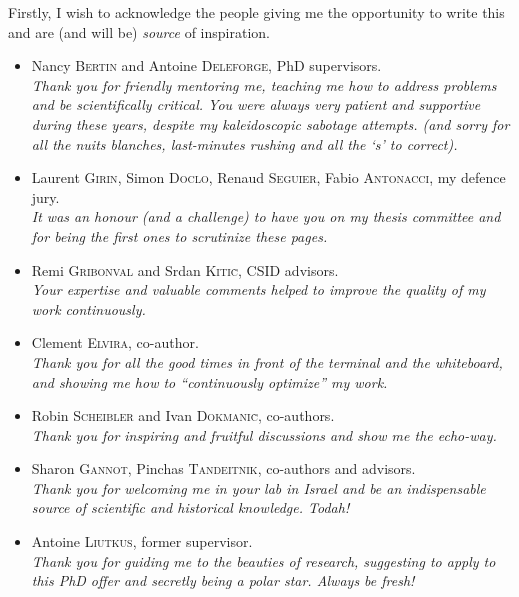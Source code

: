 \mynewline
Firstly, I wish to acknowledge the people giving me the opportunity to write this and are (and will be) \textit{source} of inspiration.
\begin{itemize}
    \item Nancy \textsc{Bertin} and Antoine \textsc{Deleforge}, PhD supervisors.
    \\\textit{Thank you for friendly mentoring me, teaching me how to address problems and be scientifically critical.
    You were always very patient and supportive during these years, despite my kaleidoscopic sabotage attempts.
    (and sorry for all the \emph{nuits blanches}, last-minutes rushing and all the `s' to correct).}

    \item Laurent \textsc{Girin}, Simon \textsc{Doclo}, Renaud \textsc{Seguier}, Fabio \textsc{Antonacci}, my defence jury.
    \\\textit{It was an honour (and a challenge) to have you on my thesis committee and for being the first ones to scrutinize these pages.}

    \item Remi \textsc{Gribonval} and Srdan \textsc{Kiti\`c}, CSID advisors.
    \\\textit{Your expertise and valuable comments helped to improve the quality of my work continuously.}

    \item Clement \textsc{Elvira}, co-author.
    \\\textit{Thank you for all the good times in front of the terminal and the whiteboard, and showing me how to ``continuously optimize'' my work.}

    \item Robin \textsc{Scheibler} and Ivan \textsc{Dokmani\`c}, co-authors.
    \\\textit{Thank you for inspiring and fruitful discussions and show me the echo-way.}

    \item Sharon \textsc{Gannot}, Pinchas \textsc{Tandeitnik}, co-authors and advisors.
    \\\textit{Thank you for welcoming me in your lab in Israel and be an indispensable source of scientific and historical knowledge. Todah!}

    \item Antoine \textsc{Liutkus}, former supervisor.
    \\\textit{Thank you for guiding me to the beauties of research, suggesting to apply to this PhD offer and secretly being a polar star. Always be fresh!}
\end{itemize}

